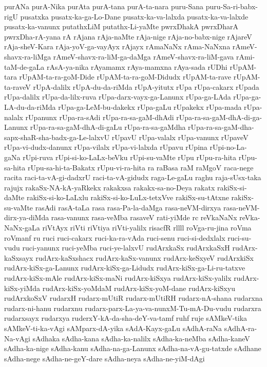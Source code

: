 {purANa
purA-Nika
purAta
purA-tana
purA-ta-nara
puru-Sana
puru-Sa-ri-babx-rigU
pusatxka
pusatx-ka-ga-Lo-Dane
pusatx-ka-va-lalxda
pusatx-ka-va-lalxde
pusatx-ka-vanunx
putathxLiM
putathx-Li-yaMte
pwrxDhakA
pwrxDharA
pwrxDha-rA-yana
rA
rAjana
rAja-naMte
rAja-nige
rAja-no-babx-nige
rAjareV
rAja-sheV-Kara
rAja-yoV-ga-vayAyx
rAjayx
rAmaNaNx
rAma-NaNxna
rAmeV-shavx-ra-liMga
rAmeV-shavx-ra-liM-ga-daMga
rAmeV-shavx-ra-liM-gava
rAmi-taM-de-gaLa
rAsA-ya-nika
rAyamamx
rAya-mamxna
rAya-sada
rUDhi
rUpAM-tara
rUpAM-ta-ra-goM-Dide
rUpAM-ta-ra-goM-Didudx
rUpAM-ta-rave
rUpAM-ta-raveV
rUpA-dalilx
rUpA-du-da-riMda
rUpA-yitutx
rUpa
rUpa-cakarx
rUpada
rUpa-dalilx
rUpa-da-lilx-ruva
rUpa-darx-vayx-ga-Lanunx
rUpa-ga-LAda
rUpa-ga-LA-du-da-riMda
rUpa-ga-LeM-bu-dakekx
rUpa-gaLu
rUpakekx
rUpa-mada
rUpa-nalalx
rUpanunx
rUpa-ra-sAdi
rUpa-ra-sa-gaM-dhAdi
rUpa-ra-sa-gaM-dhA-di-ga-Lanunx
rUpa-ra-sa-gaM-dhA-di-gaLu
rUpa-ra-sa-gaMdha
rUpa-ra-sa-gaM-dha-sapx-shaR-sha-badx-ga-Le-lalxvU
rUpavU
rUpa-valalx
rUpa-vanunx
rUpaveV
rUpa-vi-dudx-danunx
rUpa-vilalx
rUpa-vi-lalxda
rUpavu
rUpina
rUpi-no-La-gaNa
rUpi-ruva
rUpi-si-ko-LaLx-beVku
rUpi-su-vaMte
rUpu
rUpu-ra-hita
rUpu-sa-hita
rUpu-sa-hi-ta-Bakatx
rUpu-vi-ra-hita
ra
raBasa
raM
raMgoV
raca-nege
racita
raci-ta-vA-gi-dadxrU
raci-ta-vA-gidudx
raga-Le-gaLu
raghu
raja-sUsx-taka
rajujx
rakaSx-NA-kA-yaRkekx
rakakxsa
rakakx-sa-no-Deya
rakatx
rakiSx-si-daMte
rakiSx-si-ko-LaLxlu
rakiSx-si-ko-LuLx-tetxVve
rakiSx-su-tAtxne
rakiSx-su-vaMte
rasAdi
rasA-taLa
rasa
rasa-Pa-la-daMga
rasa-neVM-dirxya
rasa-neVM-dirx-ya-diMda
rasa-vanunx
rasa-veMba
rasaveV
rati-yiMde
rc
reVkaNaNx
reVka-NaNx-gaLa
riVtAyx
riVti
riVtiya
riVti-yalilx
risacfR
rllll
roVga-ru-jina
roVma
roVmanf
ru
ruci
ruci-cakarx
ruci-ka-ra-vAda
ruci-senu
ruci-si-dedxlalx
ruci-su-vudu
ruci-yanunx
ruci-yeMba
ruci-ye-lalxvU
rudArxkaSx
rudArxkaSxH
rudArx-kaSxsayx
rudArx-kaSxshacx
rudArx-kaSx-vanunx
rudArx-keSxyeV
rudArxkiSx
rudArx-kiSx-ga-Lanunx
rudArx-kiSx-ga-Lidudx
rudArx-kiSx-ga-Li-ru-tatxve
rudArx-kiSx-mAle
rudArx-kiSx-maNi
rudArx-kiSxya
rudArx-kiSx-yalilx
rudArx-kiSx-yiMda
rudArx-kiSx-yoMdaM
rudArx-kiSx-yoM-dane
rudArx-kiSxyu
rudArxkoSxV
rudarxH
rudarx-mUtiR
rudarx-mUtiRH
rudarx-nA-shana
rudarxna
rudarx-ni-hanu
rudarxnu
rudarx-parx-La-ya-va-nunxM-Tu-mA-Du-vudu
rudarxra
rudarxsayx
rudarxya
ruderxY-kA-da-sha-deY-va-tamf
ruhf
ruje
sAMkeV-tika
sAMkeV-ti-ka-vAgi
sAMparx-dA-yika
sAdA-Kayx-gaLu
sAdhA-raNa
sAdhA-ra-Na-vAgi
sAdhaka
sAdha-kana
sAdha-ka-nalilx
sAdha-ka-neMba
sAdha-kaneV
sAdha-ka-nige
sAdha-kanu
sAdha-na-ga-Lanunx
sAdha-na-vA-gu-tatxde
sAdhane
sAdha-nege
sAdha-ne-geY-dare
sAdha-neya
sAdha-ne-yiM-dAgi
}
